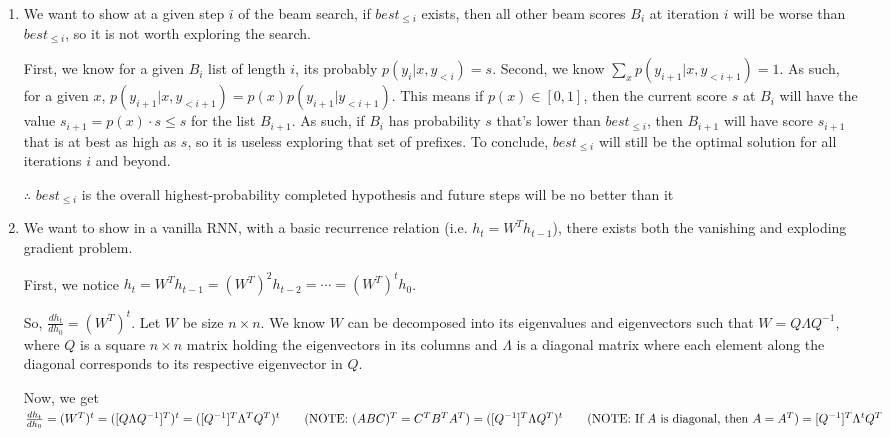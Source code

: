 \documentclass[11pt,english]{article}
\begin{document}
\begin{enumerate}
	\item We want to show at a given step $i$ of the beam search, if $\textit{best}_{\leq i}$ exists, then all other beam scores $B_i$ at iteration $i$ will be worse than $\textit{best}_{\leq i}$, so it is not worth exploring the search.
	
	First, we know for a given $B_i$ list of length $i$, its probably $p(y_i | x, y_{<i}) = s$. Second, we know $\sum_x p(y_{i+1} | x, y_{<i+1}) = 1$. As such, for a given $x$, $p(y_{i+1} | x, y_{<i+1}) = p(x)p(y_{i+1} | y_{<i+1})$. This means if $p(x) \in [0, 1]$, then the current score $s$ at $B_i$ will have the value $s_{i+1} = p(x)\cdot s \leq s$ for the list $B_{i+1}$. As such, if $B_i$ has probability $s$ that's lower than $\textit{best}_{\leq i}$, then $B_{i+1}$ will have score $s_{i+1}$ that is at best as high as $s$, so it is useless exploring that set of prefixes. To conclude, $\textit{best}_{\leq i}$ will still be the optimal solution for all iterations $i$ and beyond.
	
	$\therefore$ $\textit{best}_{\leq i}$ is the overall highest-probability completed hypothesis and future steps will be no better than it \pagebreak 
	\item We want to show in a vanilla RNN, with a basic recurrence relation (i.e. $h_t = W^T h_{t-1}$), there exists both the vanishing and exploding gradient problem.
	
	First, we notice $h_t = W^T h_{t-1} = (W^T)^2 h_{t-2} = \cdots = (W^T)^t h_0$.
	
	So, $\frac{dh_t}{dh_0} = (W^T)^t$. Let $W$ be size $n\times n$. We know $W$ can be decomposed into its eigenvalues and eigenvectors such that $W = Q\Lambda Q^{-1}$, where $Q$ is a square $n\times n$ matrix holding the eigenvectors in its columns and $\Lambda$ is a diagonal matrix where each element along the diagonal corresponds to its respective eigenvector in $Q$.
	
	Now, we get $\frac{dh_t}{dh_0} = (W^T)^t \\
	= ([Q\Lambda Q^{-1}]^T)^t \\
	= ([Q^{-1}]^T\Lambda^T Q^T)^t \qquad(\text{NOTE: } (ABC)^T = C^TB^TA^T)\\
	= ([Q^{-1}]^T\Lambda Q^T)^t \qquad(\text{NOTE: } \text{If } A \text{ is diagonal, then } A = A^T) \\
	= [Q^{-1}]^T\Lambda^t Q^T$\\
	

\end{enumerate}
\end{document}
